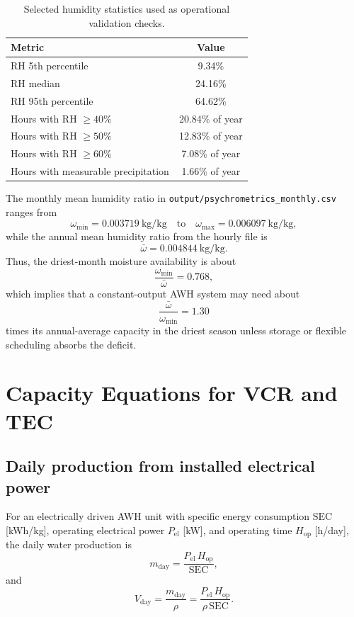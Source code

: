 \documentclass[11pt,a4paper]{article}
\begin{document}
\begin{table}[h]
\centering
\caption{Selected humidity statistics used as operational validation checks.}
\begin{tabular}{@{}lc@{}}
\toprule
\textbf{Metric} & \textbf{Value} \\
\midrule
RH 5th percentile & 9.34\% \\
RH median & 24.16\% \\
RH 95th percentile & 64.62\% \\
Hours with RH $\ge 40\%$ & 20.84\% of year \\
Hours with RH $\ge 50\%$ & 12.83\% of year \\
Hours with RH $\ge 60\%$ & 7.08\% of year \\
Hours with measurable precipitation & 1.66\% of year \\
\bottomrule
\end{tabular}
\end{table}

\noindent
The monthly mean humidity ratio in \texttt{output/psychrometrics\_monthly.csv} ranges from
\begin{equation}
\omega_{\min}=0.003719\ \mathrm{kg/kg}
\quad\text{to}\quad
\omega_{\max}=0.006097\ \mathrm{kg/kg},
\end{equation}
while the annual mean humidity ratio from the hourly file is
\begin{equation}
\bar{\omega}=0.004844\ \mathrm{kg/kg}.
\end{equation}
Thus, the driest-month moisture availability is about
\begin{equation}
\frac{\omega_{\min}}{\bar{\omega}}=0.768,
\end{equation}
which implies that a constant-output AWH system may need about
\begin{equation}
\frac{\bar{\omega}}{\omega_{\min}}=1.30
\end{equation}
times its annual-average capacity in the driest season unless storage or flexible scheduling absorbs the deficit.

\section{Capacity Equations for VCR and TEC}
\subsection{Daily production from installed electrical power}
For an electrically driven AWH unit with specific energy consumption $\mathrm{SEC}$ [kWh/kg], operating electrical power $P_{\mathrm{el}}$ [kW], and operating time $H_{\mathrm{op}}$ [h/day], the daily water production is
\begin{equation}
m_{\mathrm{day}}=\frac{P_{\mathrm{el}}\,H_{\mathrm{op}}}{\mathrm{SEC}},
\end{equation}
and
\begin{equation}
V_{\mathrm{day}}=\frac{m_{\mathrm{day}}}{\rho}
=\frac{P_{\mathrm{el}}\,H_{\mathrm{op}}}{\rho\,\mathrm{SEC}}.
\end{equation}
\end{document}
